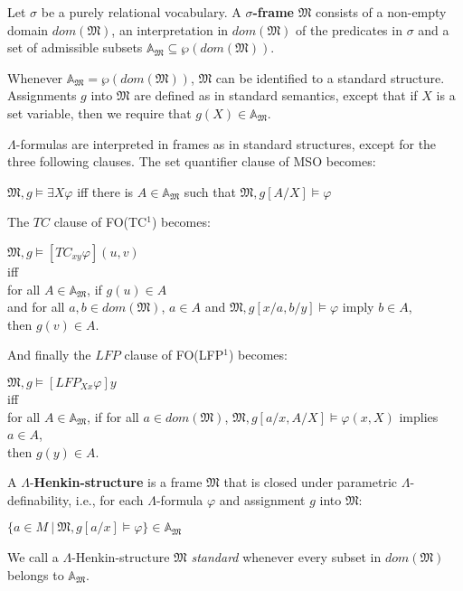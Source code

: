 \documentclass{LMCS}
\newcommand{\frM}{\mathfrak{M}}
\newcommand{\mso}{\textsf{MSO}\xspace}
\newcommand{\fotc}{\textsf{FO(TC$^1$)}\xspace}
\newcommand{\folfp}{\textsf{FO(LFP$^1$)}\xspace}
\begin{document}
\begin{defi}
[Frames]
    Let $\sigma$ be a purely relational vocabulary. A \textbf{$\sigma$-frame} $\frM$ consists of a non-empty domain
    $dom(\frM)$, an interpretation in $dom(\frM)$ of the predicates in $\sigma$ and a set of admissible subsets $\mathbb{A}_\frM \subseteq \wp(dom(\frM))$.
\end{defi}
Whenever $\mathbb{A}_\frM = \wp(dom(\frM))$, $\frM$ can be identified to a standard structure. Assignments $g$ into $\frM$ are defined as in standard semantics, except that if $X$ is a set variable, then we require that $g(X) \in
    \mathbb{A}_\frM$.
\begin{defi}
$\Lambda$-formulas are interpreted in frames as in standard structures, except for the three following clauses. The set quantifier clause of \mso becomes:
\begin{center}
$\frM, g \models \exists X \varphi$ iff there is $A \in
\mathbb{A}_{\frM}$ such that $\frM, g[A/X] \models \varphi$
\end{center}
The $TC$ clause of \fotc becomes:
\begin{center}
$\frM, g \models [TC_{xy} \varphi](u,v)$\\
iff\\
for all $A \in \mathbb{A}_{\frM}$, if $g(u) \in A$\\
and for all $a, b \in dom(\frM)$, $a\in A$ and $\frM, g[x/a,b/y]
\models \varphi$ imply
$b\in A$,\\
then $g(v)\in A$.
\end{center}

And finally the $LFP$ clause of \folfp becomes:
\begin{center}
$\frM, g \models [LFP_{Xx}\varphi]y$\\
iff\\
for all $A \in \mathbb{A}_\frM$, if for all $a \in dom(\frM)$, $\frM, g[a/x,A/X]
\models \varphi(x,X)$ implies $a \in A$,\\
then $g(y)\in A$.
\end{center}
\label{hensem}
\end{defi}

\begin{defi}
    A $\Lambda$-\textbf{Henkin-structure} is a frame $\frM$ that is closed
    under parametric $\Lambda$-definability, i.e., for each $\Lambda$-formula
    $\varphi$ and assignment $g$ into $\frM$:
\begin{center}
$\{a \in M ~|~ \frM, g[a/x] \models \varphi\} \in \mathbb{A}_{\frM}$
\end{center}
We call a $\Lambda$-Henkin-structure $\frM$ \emph{standard} whenever
every subset in $dom(\frM)$ belongs to $\mathbb{A}_{\frM}$. 
\end{defi}
\end{document}
